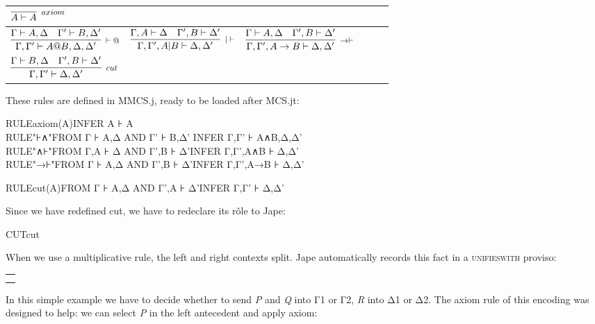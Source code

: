 \documentclass[11pt]{book}
\newcommand{\tab}{\hspace{5mm}}
\newcommand{\reason}[1]{\scalebox{0.85}{#1}}
\begin{document}
\begin{tabular}{|p{1.457in}|p{1.457in}|p{1.457in}|p{0.043in}|p{0.043in}|p{0.043in}|}
\hline
{\raggedright 
$\infer[\reason{$axiom$}]
       {A |- A}
       {}$
} & 
{\raggedright } & 
{\raggedright }\\
\hline
{\raggedright 
$\infer[\reason{$ |- @$}]
       {\Gamma,\Gamma ' |- A@B,\Delta,\Delta ' }
       {\Gamma  |- A,\Delta \quad \Gamma '  |- B,\Delta ' }$
} & 
{\raggedright 
$\infer[\reason{$| |- $}]
       {\Gamma,\Gamma ' ,A|B |- \Delta,\Delta ' }
       {\Gamma,A |- \Delta \quad \Gamma ',B |- \Delta ' }$
} & 
{\raggedright 
$\infer[\reason{$->|- $}]
       {\Gamma,\Gamma ' ,A->B |- \Delta,\Delta ' }
       {\Gamma  |- A,\Delta \quad \Gamma ',B |- \Delta ' }$
}\\
\hline
{\raggedright 
$\infer[\reason{$cut$}]
       {\Gamma,\Gamma ' |- \Delta,\Delta ' }
       {\Gamma  |- B,\Delta \quad \Gamma ',B |- \Delta ' }$
} & 
{\raggedright } & 
{\raggedright }\\
\hline
\end{tabular}


These rules are defined in MMCS.j, ready to be loaded after MCS.jt:

RULE\tab axiom(A)\tab INFER A ⊦ A\\
RULE\tab "⊦∧"\tab FROM Γ ⊦ A,Δ AND Γ' 
⊦ B,Δ' \tab INFER Γ,Γ' ⊦ A∧B,Δ,Δ'\\
RULE\tab "∧⊦"\tab FROM Γ,A ⊦ Δ AND Γ',B 
⊦ Δ'\tab INFER Γ,Γ',A∧B ⊦ Δ,Δ'\\
RULE\tab "→⊦"\tab FROM Γ ⊦ A,Δ AND Γ',B 
⊦ Δ'\tab INFER Γ,Γ',A→B ⊦ Δ,Δ'

RULE\tab cut(A)\tab FROM Γ ⊦ A,Δ AND Γ',A ⊦ Δ'\tab INFER 
Γ,Γ' ⊦ Δ,Δ'


Since we have redefined cut, we have to redeclare its r\^{o}le to Jape:

CUT\tab cut


When we use a multiplicative rule, the left and right contexts split. Jape automatically records this fact in a \textsc{unifieswith} proviso:\\


\begin{tabular}{|p{3.278in}|}
\hline
{\raggedright }\\
\hline
{\raggedright }\\
\hline
{\raggedright  }\\
\hline
\end{tabular}


In this simple example we have to decide whether to send \textit{P} and \textit{Q} into Γ1 or Γ2, \textit{R} into Δ1 or Δ2. The axiom rule of this encoding was designed to help: we can select \textit{P} in the left antecedent and apply axiom:
\end{document}
